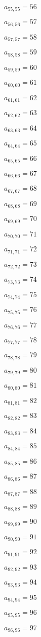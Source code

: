 \documentclass[a4paper,12pt]{article}
\begin{document}
$a _{ 55, 55 } = 56$

$a _{ 56, 56 } = 57$

$a _{ 57, 57 } = 58$

$a _{ 58, 58 } = 59$

$a _{ 59, 59 } = 60$

$a _{ 60, 60 } = 61$

$a _{ 61, 61 } = 62$

$a _{ 62, 62 } = 63$

$a _{ 63, 63 } = 64$

$a _{ 64, 64 } = 65$

$a _{ 65, 65 } = 66$

$a _{ 66, 66 } = 67$

$a _{ 67, 67 } = 68$

$a _{ 68, 68 } = 69$

$a _{ 69, 69 } = 70$

$a _{ 70, 70 } = 71$

$a _{ 71, 71 } = 72$

$a _{ 72, 72 } = 73$

$a _{ 73, 73 } = 74$

$a _{ 74, 74 } = 75$

$a _{ 75, 75 } = 76$

$a _{ 76, 76 } = 77$

$a _{ 77, 77 } = 78$

$a _{ 78, 78 } = 79$

$a _{ 79, 79 } = 80$

$a _{ 80, 80 } = 81$

$a _{ 81, 81 } = 82$

$a _{ 82, 82 } = 83$

$a _{ 83, 83 } = 84$

$a _{ 84, 84 } = 85$

$a _{ 85, 85 } = 86$

$a _{ 86, 86 } = 87$

$a _{ 87, 87 } = 88$

$a _{ 88, 88 } = 89$

$a _{ 89, 89 } = 90$

$a _{ 90, 90 } = 91$

$a _{ 91, 91 } = 92$

$a _{ 92, 92 } = 93$

$a _{ 93, 93 } = 94$

$a _{ 94, 94 } = 95$

$a _{ 95, 95 } = 96$

$a _{ 96, 96 } = 97$
\end{document}
